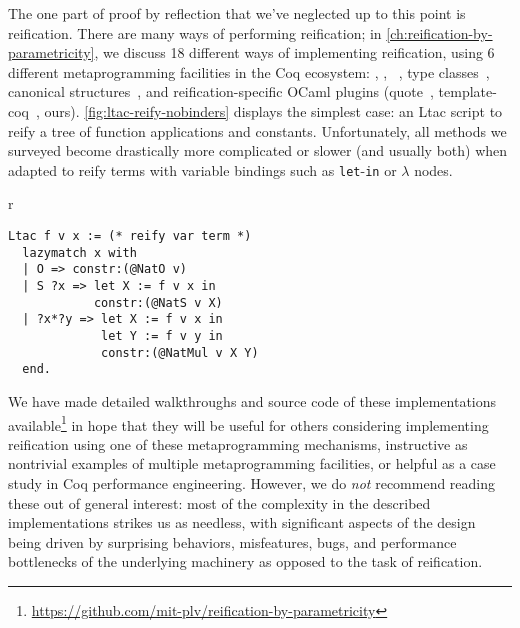 The one part of proof by reflection that we've neglected up to this point is reification.
There are many ways of performing reification; in \autoref{ch:reification-by-parametricity}, we discuss 18 different ways of implementing reification, using 6 different metaprogramming facilities in the Coq ecosystem: \Ltac, \LtacTwo, \Mtac~\cite{lessadhoc,Mtac2}, type classes~\cite{sozeau2008first}, canonical structures~\cite{gonthier2016small}, and reification-specific OCaml plugins (quote~\cite{quote-plugin}, template-coq~\cite{TemplateCoq}, ours).
\autoref{fig:ltac-reify-nobinders} displays the simplest case: an Ltac script to reify a tree of function applications and constants.
Unfortunately, all methods we surveyed become drastically more complicated or slower (and usually both) when adapted to reify terms with variable bindings such as \texttt{let}-\texttt{in} or \texttt{$\lambda$} nodes.


\begin{wrapfigure}[10]{r}{}
\begin{verbatim}
Ltac f v x := (* reify var term *)
  lazymatch x with
  | O => constr:(@NatO v)
  | S ?x => let X := f v x in
            constr:(@NatS v X)
  | ?x*?y => let X := f v x in
             let Y := f v y in
             constr:(@NatMul v X Y)
  end.
\end{verbatim}
\caption{Reification Without Binders in \Ltac}\label{fig:ltac-reify-nobinders}
\end{wrapfigure}

We have made detailed walkthroughs and source code of these implementations available\footnote{\url{https://github.com/mit-plv/reification-by-parametricity}} in hope that they will be useful for others considering implementing reification using one of these metaprogramming mechanisms, instructive as nontrivial examples of multiple metaprogramming facilities, or helpful as a case study in Coq performance engineering.
However, we do \emph{not} recommend reading these out of general interest:
most of the complexity in the described implementations strikes us as needless,
with significant aspects of the design being driven by surprising behaviors, misfeatures, bugs, and performance bottlenecks of the underlying machinery as opposed to the task of reification.


